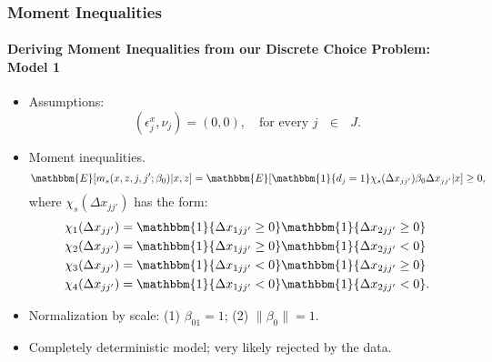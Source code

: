 \begin{frame}
\frametitle{Moment Inequalities}
\framesubtitle{Deriving Moment Inequalities from our Discrete Choice Problem: Model 1}

\begin{itemize}
	\item Assumptions: 
	\begin{equation*}
	(\epsilon^{x}_{j}, \nu_{j}) = (0,0),\quad\text{for every $j$ $\in$ $J$.}
	\end{equation*}
	\item Moment inequalities. 
	\begin{equation*}
	\mathbbm{E}[m_{s}(x,z,j,j';\beta_{0})|x,z]=\mathbbm{E}[\mathbbm{1}\{d_{j}=1\}\chi_{s}(\Delta x_{jj'}) \beta_{0}\Delta x_{jj'}|x]\geq 0,
	\end{equation*}
	where $\chi_{s}(\Delta x_{jj'})$ has the form:
	\begin{subequations}\label{eq: inst}
	\begin{align}
	\chi_{1}(\Delta x_{jj'}) &= \mathbbm{1}\{\Delta x_{1jj'}\geq 0\}\mathbbm{1}\{\Delta x_{2jj'}\geq 0\}\\
	\chi_{2}(\Delta x_{jj'}) &= \mathbbm{1}\{\Delta x_{1jj'}\geq 0\}\mathbbm{1}\{\Delta x_{2jj'}<0\}\\
	\chi_{3}(\Delta x_{jj'}) &= \mathbbm{1}\{\Delta x_{1jj'}<0\}\mathbbm{1}\{\Delta x_{2jj'}\geq 0\}\\
	\chi_{4}(\Delta x_{jj'}) &= \mathbbm{1}\{\Delta x_{1jj'}<0\}\mathbbm{1}\{\Delta x_{2jj'}<0\}.
	\end{align}
	\end{subequations}
	\item Normalization by scale: (1) $\beta_{01}=1$; (2) $\|\beta_{0}\|=1$.
	\item Completely deterministic model; very likely rejected by the data.
\end{itemize}
\end{frame}
